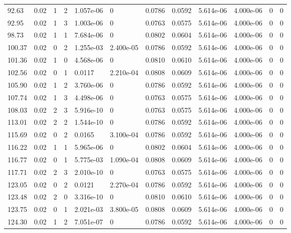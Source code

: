 \documentclass[preview]{standalone}
\begin{document}
{{{\begin{tabular}{L{1.2cm}C{1.2cm} C{0.3cm}C{0.5cm} C{1.4cm}C{1.4cm} C{1.4cm}C{1.4cm} C{1.6cm}C{1.6cm} C{1.6cm}C{1.6cm}}
  92.63  &  0.02  & 1     &  2 &  1.057e-06  & 0  &  0.0786&   0.0592& 5.614e-06 & 4.000e-06   &  0 & 0  \\ 
  92.95  &  0.02  & 1     &  3 &  1.003e-06  & 0  &  0.0763&   0.0575& 5.614e-06 & 4.000e-06   &  0 & 0  \\ 
  98.73  &  0.02  & 1     &  1 &  7.684e-06  & 0  &  0.0802&   0.0604& 5.614e-06 & 4.000e-06   &  0 & 0  \\ 
  100.37  &  0.02  & 0     &  2 &  1.255e-03  & 2.400e-05  &  0.0786&   0.0592& 5.614e-06 & 4.000e-06   &  0 & 0  \\ 
  101.36  &  0.02  & 1     &  0 &  4.568e-06  & 0  &  0.0810&   0.0610& 5.614e-06 & 4.000e-06   &  0 & 0  \\ 
  102.56  &  0.02  & 0     &  1 &  0.0117  & 2.210e-04  &  0.0808&   0.0609& 5.614e-06 & 4.000e-06   &  0 & 0  \\ 
  105.90  &  0.02  & 1     &  2 &  3.760e-06  & 0  &  0.0786&   0.0592& 5.614e-06 & 4.000e-06   &  0 & 0  \\ 
  107.74  &  0.02  & 1     &  3 &  4.498e-06  & 0  &  0.0763&   0.0575& 5.614e-06 & 4.000e-06   &  0 & 0  \\ 
  108.03  &  0.02  & 2     &  3 &  5.916e-10  & 0  &  0.0763&   0.0575& 5.614e-06 & 4.000e-06   &  0 & 0  \\ 
  113.01  &  0.02  & 2     &  2 &  1.544e-10  & 0  &  0.0786&   0.0592& 5.614e-06 & 4.000e-06   &  0 & 0  \\ 
  115.69  &  0.02  & 0     &  2 &  0.0165  & 3.100e-04  &  0.0786&   0.0592& 5.614e-06 & 4.000e-06   &  0 & 0  \\ 
  116.22  &  0.02  & 1     &  1 &  5.965e-06  & 0  &  0.0802&   0.0604& 5.614e-06 & 4.000e-06   &  0 & 0  \\ 
  116.77  &  0.02  & 0     &  1 &  5.775e-03  & 1.090e-04  &  0.0808&   0.0609& 5.614e-06 & 4.000e-06   &  0 & 0  \\ 
  117.71  &  0.02  & 2     &  3 &  2.010e-10  & 0  &  0.0763&   0.0575& 5.614e-06 & 4.000e-06   &  0 & 0  \\ 
  123.05  &  0.02  & 0     &  2 &  0.0121  & 2.270e-04  &  0.0786&   0.0592& 5.614e-06 & 4.000e-06   &  0 & 0  \\ 
  123.48  &  0.02  & 2     &  0 &  3.316e-10  & 0  &  0.0810&   0.0610& 5.614e-06 & 4.000e-06   &  0 & 0  \\ 
  123.75  &  0.02  & 0     &  1 &  2.021e-03  & 3.800e-05  &  0.0808&   0.0609& 5.614e-06 & 4.000e-06   &  0 & 0  \\ 
  124.30  &  0.02  & 1     &  2 &  7.051e-07  & 0  &  0.0786&   0.0592& 5.614e-06 & 4.000e-06   &  0 & 0  \\ 

\end{tabular}}}}
\end{document}

